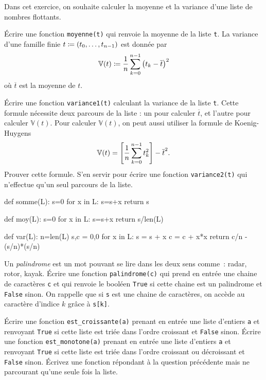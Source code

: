 \documentclass{magnolia}
\begin{document}
 Dans cet exercice, on souhaite calculer la moyenne et la variance d'une liste
  de nombres flottants.
  \begin{questions}
  \question Écrire une fonction \verb!moyenne(t)! qui renvoie la
    moyenne de la liste \verb!t!.
  \question La variance d'une famille finie $t\coloneqq (t_0,\dots,t_{n-1})$ est donnée par
      \[\mathbb{V}(t)\coloneqq\frac{1}{n}\sum_{k=0}^{n-1} \left(t_k-\overline{t}\right)^2\] 
  où $\overline{t}$ est la moyenne de $t$.
  \begin{questions}
  \question Écrire une fonction \verb!variance1(t)! calculant
    la variance de la liste \verb!t!.
  \enonce Cette formule nécessite deux parcours de la liste : un pour calculer $\overline{t}$, et l'autre pour calculer $\mathbb{V}(t)$. Pour calculer $\mathbb{V}(t)$, on peut aussi utiliser la formule de Koenig-Huygens
  \[\mathbb{V}(t)=\left[\frac{1}{n}\sum_{k=0}^{n-1} t_k^2\right] -\overline{t}^2.\]
  \question Prouver cette formule.
  \question S'en servir pour écrire une fonction \verb!variance2(t)! qui n'effectue qu'un seul parcours de la liste.
  \end{questions}
  \end{questions}
  \begin{sol}
  \begin{pythoncode}
  def somme(L):
      s=0
      for x in L:
          s=s+x
      return s
  \end{pythoncode}
  \begin{pythoncode}
  def moy(L):
      s=0
      for x in L:
          s=s+x
      return s/len(L)
  \end{pythoncode}
  \begin{pythoncode}
  def var(L):
      n=len(L)
      s,c = 0,0
      for x in L:
          s = s + x
          c = c + x*x
      return c/n - (s/n)*(s/n)
  \end{pythoncode}
  \end{sol}

Un \emph{palindrome} est un mot pouvant se lire dans les deux sens comme~: radar, rotor, kayak.
Écrire une fonction \verb_palindrome(c)_ qui prend en entrée une chaine de caractères \verb_c_ et qui renvoie le booléen \verb_True_ si cette chaine est un palindrome et \verb_False_ sinon. On rappelle que si \verb_s_ est une chaine de
caractères, on accède au caractère d'indice $k$ grâce à \verb_s[k]_.

\begin{questions}
\question Écrire une fonction \verb!est_croissante(a)! prenant en entrée une liste d'entiers \verb!a! et renvoyant
  \verb!True! si cette liste est triée dans l'ordre croissant et \verb_False_ sinon.
\question Écrire une fonction \verb!est_monotone(a)! prenant en entrée une liste d'entiers \verb!a! et renvoyant
  \verb!True! si cette liste est triée dans l'ordre croissant ou décroissant et \verb_False_ sinon.
\question Écrivez une fonction répondant à la question précédente mais ne parcourant qu'une seule fois la liste.
\end{questions}
\end{document}

